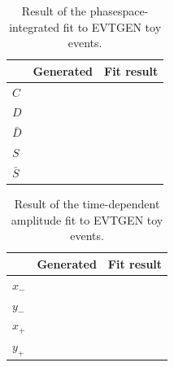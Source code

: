\begin{table}[h]
\caption{Result of the phasespace-integrated fit to \textsf{EVTGEN} toy events.} 		
  \centering
  \begin{tabular}
    {l c c}
    \hline \hline
    & Generated &  Fit result  \\   \hline
    $C$ &   &  	 \\
    $D$ &   &  	 \\
    $\bar D$ &   &  	 \\
    $S$ &   &  	 \\
    $\bar S$ &   &  	 \\
    \hline \hline
  \end{tabular}
    \label{tab:FitGenMC}
\end{table}

\begin{table}[h]
\caption{Result of the time-dependent amplitude fit to \textsf{EVTGEN} toy events.} 		
  \centering
  \begin{tabular}
    {l c c}
    \hline \hline
    & Generated &  Fit result  \\   \hline
    $x_-$ &   &  	 \\
    $y_-$ &   &  	 \\
    $x_+$ &   &  	 \\
    $y_+$ &   &  	 \\
    \hline \hline
  \end{tabular}
    \label{tab:FitGenMC2}
\end{table}



